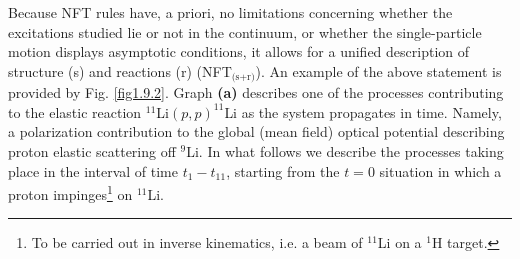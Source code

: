  Because NFT rules have, a priori,  no limitations concerning whether the excitations studied lie or not in the continuum, or whether the single-particle motion displays asymptotic conditions, it allows for a unified description of structure (s) and reactions (r) (NFT$_{\text{(s+r)}}$). An example of the above statement is provided by Fig. \ref{fig1.9.2}. Graph \textbf{(a)} describes  one of the processes contributing to the elastic
reaction $^{11}$Li$(p,p)^{11}$Li as the system propagates in time. Namely, a polarization contribution to
the global (mean field) optical potential describing proton elastic scattering off $^{9}$Li. 
In what follows we describe the processes taking place  in the interval of time $t_1-t_{11}$, starting from the $t=0$ situation in which a proton impinges\footnote{To be carried out in inverse kinematics, i.e. a beam of $^{11}$Li on a $^1$H target.} on $^{11}$Li.


